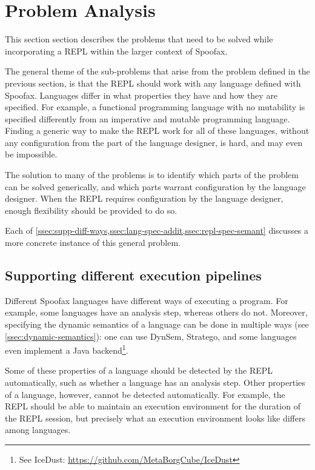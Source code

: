 \section{Problem Analysis}
\label{sec:problem-analysis}
This section section describes the problems that need to be solved while
incorporating a REPL within the larger context of Spoofax.

The general theme of the sub-problems that arise from the problem
defined in the previous section, is that the REPL should work
with any language defined with Spoofax. Languages differ in what
properties they have and how they are specified. For example, a
functional programming language with no mutability is specified
differently from an imperative and mutable programming
language. Finding a generic way to make the REPL work for all of these
languages, without any configuration from the part of the language
designer, is hard, and may even be impossible.

The solution to many of the problems is to identify which parts of the problem
can be solved generically, and which parts warrant configuration by the
language designer. When the REPL requires configuration by the language
designer, enough flexibility should be provided to do so.

Each of \cref{ssec:supp-diff-ways,ssec:lang-spec-addit,ssec:repl-spec-semant}
discusses a more concrete instance of this general problem.

\subsection{Supporting different execution pipelines}
\label{ssec:supp-diff-ways}
Different Spoofax languages have different ways of executing a program.
For example, some languages have an analysis step, whereas
others do not. Moreover, specifying the dynamic semantics of a language
can be done in multiple ways (see \cref{ssec:dynamic-semantics}): one
can use DynSem, Stratego, and some languages even implement a Java
backend\footnote{See IceDust:
  \url{https://github.com/MetaBorgCube/IceDust}}.

Some of these properties of a language should be detected by the REPL
automatically, such as whether a language has an analysis step.
Other properties of a language, however, cannot be detected
automatically. For example, the REPL should be able to maintain an
execution environment for the duration of the REPL session, but
precisely what an execution environment looks like differs among
languages.

